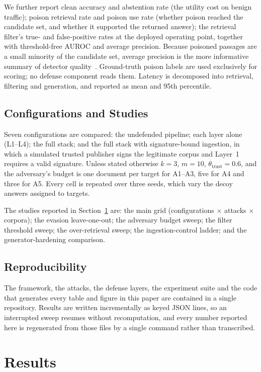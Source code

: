 We further report clean accuracy and abstention rate (the utility cost on benign traffic);
poison retrieval rate and poison use rate (whether poison reached the candidate set, and
whether it supported the returned answer); the retrieval filter's true- and false-positive
rates at the deployed operating point, together with threshold-free AUROC and average
precision. Because poisoned passages are a small minority of the candidate set, average
precision is the more informative summary of detector quality~\citep{davis2006prc,saito2015prc}.
Ground-truth poison labels are used exclusively for scoring; no defense component reads them.
Latency is decomposed into retrieval, filtering and generation, and reported as mean and 95th
percentile.

\subsection{Configurations and Studies}

Seven configurations are compared: the undefended pipeline; each layer alone (L1--L4); the full
stack; and the full stack with signature-bound ingestion, in which a simulated trusted publisher
signs the legitimate corpus and Layer~1 requires a valid signature. Unless stated otherwise $k = 3$,
$m = 10$, $\theta_{\mathrm{trust}} = 0.6$, and the adversary's budget is one document per
target for A1--A3, five for A4 and three for A5. Every cell is repeated over three seeds, which
vary the decoy answers assigned to targets.

The studies reported in Section~\ref{sec:results} are: the main grid (configurations $\times$ attacks $\times$ corpora); the
evasion leave-one-out; the adversary budget sweep; the filter threshold sweep; the
over-retrieval sweep; the ingestion-control ladder; and the generator-hardening comparison.

\subsection{Reproducibility}

The framework, the attacks, the defense layers, the experiment suite and the code that
generates every table and figure in this paper are contained in a single repository. Results
are written incrementally as keyed JSON lines, so an interrupted sweep resumes without
recomputation, and every number reported here is regenerated from those files by a single
command rather than transcribed.

\section{Results}
\label{sec:results}

